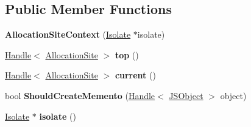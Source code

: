 \subsection*{Public Member Functions}
\begin{DoxyCompactItemize}
\item 
\hypertarget{classv8_1_1internal_1_1_allocation_site_context_acad3aa6b62e34d542b6fd6c9b87e2093}{}{\bfseries Allocation\+Site\+Context} (\hyperlink{classv8_1_1internal_1_1_isolate}{Isolate} $\ast$isolate)\label{classv8_1_1internal_1_1_allocation_site_context_acad3aa6b62e34d542b6fd6c9b87e2093}

\item 
\hypertarget{classv8_1_1internal_1_1_allocation_site_context_a76427a09d8c0eef6794ecfd804ca8eea}{}\hyperlink{classv8_1_1internal_1_1_handle}{Handle}$<$ \hyperlink{classv8_1_1internal_1_1_allocation_site}{Allocation\+Site} $>$ {\bfseries top} ()\label{classv8_1_1internal_1_1_allocation_site_context_a76427a09d8c0eef6794ecfd804ca8eea}

\item 
\hypertarget{classv8_1_1internal_1_1_allocation_site_context_a20943342b9c850bc0f1c3fd0aef56e9a}{}\hyperlink{classv8_1_1internal_1_1_handle}{Handle}$<$ \hyperlink{classv8_1_1internal_1_1_allocation_site}{Allocation\+Site} $>$ {\bfseries current} ()\label{classv8_1_1internal_1_1_allocation_site_context_a20943342b9c850bc0f1c3fd0aef56e9a}

\item 
\hypertarget{classv8_1_1internal_1_1_allocation_site_context_adfa2a2817414d94fd00728a2c163d7b0}{}bool {\bfseries Should\+Create\+Memento} (\hyperlink{classv8_1_1internal_1_1_handle}{Handle}$<$ \hyperlink{classv8_1_1internal_1_1_j_s_object}{J\+S\+Object} $>$ object)\label{classv8_1_1internal_1_1_allocation_site_context_adfa2a2817414d94fd00728a2c163d7b0}

\item 
\hypertarget{classv8_1_1internal_1_1_allocation_site_context_a8adcb0b60cf5fbda807b0a11c128ab4a}{}\hyperlink{classv8_1_1internal_1_1_isolate}{Isolate} $\ast$ {\bfseries isolate} ()\label{classv8_1_1internal_1_1_allocation_site_context_a8adcb0b60cf5fbda807b0a11c128ab4a}

\end{DoxyCompactItemize}
